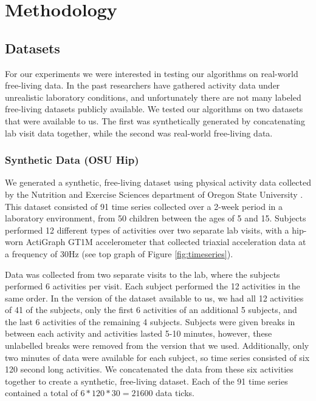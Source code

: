 \chapter{Methodology}

\section{Datasets}
For our experiments we were interested in testing our algorithms on real-world free-living
data. In the past researchers have gathered activity data under unrealistic
laboratory conditions, and unfortunately there are not many labeled free-living
datasets publicly available. We tested our algorithms on two datasets that were
available to us. The first was synthetically generated by concatenating lab
visit data together, while the second was real-world free-living data.

\subsection{Synthetic Data (OSU Hip)}
We generated a synthetic, free-living dataset using physical activity data
collected by the Nutrition and Exercise Sciences department of
Oregon State University \cite{trost12} \cite{zheng12}.
This dataset consisted of 91 time series collected over a 2-week period in a
laboratory environment, from 50 children between the ages of 5 and 15. Subjects
performed 12 different types of activities  over two separate lab visits, with
a hip-worn ActiGraph GT1M accelerometer that collected triaxial acceleration
data at a frequency of 30Hz (see top graph of Figure \ref{fig:timeseries}).

Data was collected from two separate visits to the lab, where the subjects performed 6 activities per visit.
Each subject performed the 12 activities in the same order.
In the version of the dataset available to us, we had all 12 activities of
41 of the subjects, only the first 6 activities of an additional 5 subjects,
and the last 6 activities of the remaining 4 subjects.
Subjects were given breaks in between each activity and activities lasted 5-10
minutes, however, these unlabelled breaks were removed from the version that we
used. Additionally, only two minutes of data were available for each subject, so 
time series consisted of six 120 second long activities. We concatenated the
data from these six activities together to create a synthetic, free-living dataset. 
Each of the 91 time series contained a total of $6*120*30 = 21600$ data ticks.

